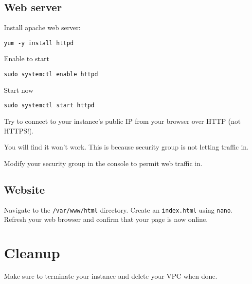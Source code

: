 \documentclass{pgnotes}
\begin{document}
\subsection{Web server}\label{web-server}

Install apache web server:

\begin{verbatim}
yum -y install httpd
\end{verbatim}

Enable to start

\begin{verbatim}
sudo systemctl enable httpd
\end{verbatim}

Start now

\begin{verbatim}
sudo systemctl start httpd
\end{verbatim}

Try to connect to your instance's public IP from your browser over HTTP
(not HTTPS!).

You will find it won't work. This is because security group is not
letting traffic in.

Modify your security group in the console to permit web traffic in. 


\subsection{Website}\label{website}

Navigate to the \texttt{/var/www/html} directory.
Create an \texttt{index.html} using \texttt{nano}.
Refresh your web browser and confirm that your page is now online. 


\section{Cleanup}

Make sure to terminate your instance and delete your VPC when done.
\end{document}
